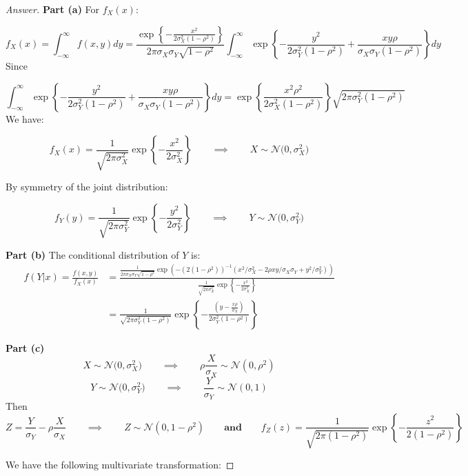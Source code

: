 \documentclass{article}
\theoremstyle{definition}
\newcommand{\qiq}{\qquad \implies \qquad}
\newcommand{\qaq}{\qquad \textbf{and} \qquad}
\begin{document}
\begin{proof}[Answer]
\textbf{Part (a)}
For $f_X(x)$:

$$f_{X}(x)=\int_{-\infty}^{\infty} f(x, y) d y=\frac{\exp \left\{-\frac{x^{2}}{2 \sigma_{X}^{2}\left(1-\rho^{2}\right)}\right\}}{2 \pi \sigma_{X} \sigma_{Y} \sqrt{1-\rho^{2}}} \int_{-\infty}^{\infty} \exp \left\{-\frac{y^{2}}{2 \sigma_{Y}^{2}\left(1-\rho^{2}\right)}+\frac{x y \rho}{\sigma_{X} \sigma_{Y}\left(1-\rho^{2}\right)}\right\} d y$$
Since

$$\int_{-\infty}^{\infty} \exp \left\{-\frac{y^{2}}{2 \sigma_{Y}^{2}\left(1-\rho^{2}\right)}+\frac{x y \rho}{\sigma_{X} \sigma_{Y}\left(1-\rho^{2}\right)}\right\} d y=\exp \left\{\frac{x^{2} \rho^{2}}{2 \sigma_{X}^{2}\left(1-\rho^{2}\right)}\right\} \sqrt{2 \pi \sigma_{Y}^{2}\left(1-\rho^{2}\right)}$$
We have:

$$f_X(x) = \frac{1}{\sqrt{2 \pi \sigma_{X}^{2}}} \exp \left\{-\frac{x^{2}}{2 \sigma_{X}^{2}}\right\} \qiq X\sim\mathcal{N}\big(0, \sigma_X^2\big)$$

By symmetry of the joint distribution:

$$f_Y(y) = \frac{1}{\sqrt{2 \pi \sigma_{Y}^{2}}} \exp \left\{-\frac{y^{2}}{2 \sigma_{Y}^{2}}\right\} \qiq Y\sim\mathcal{N}\big(0, \sigma_Y^2\big)$$

\textbf{Part (b)}
The conditional distribution of $Y$ is:
\begin{align*}
f(Y|x) = \frac{f(x,y)}{f_X(x)} &= \frac{\frac{1}{2 \pi \sigma_{X} \sigma_{Y} \sqrt{1-\rho^{2}}} \exp \left(-\left(2\left(1-\rho^{2}\right)\right)^{-1}\left(x^{2} / \sigma_{X}^{2}-2 \rho x y / \sigma_{X} \sigma_{Y}+y^{2} / \sigma_{Y}^{2}\right)\right)}{\frac{1}{\sqrt{2 \pi \sigma_{X}^{2}}} \exp \left\{-\frac{x^{2}}{2 \sigma_{X}^{2}}\right\} } \\ &= \frac{1}{\sqrt{2 \pi \sigma_{Y}^{2}\left(1-\rho^{2}\right)}} \exp \left\{-\frac{\left(y-\frac{x \rho}{\sigma_{X}}\right)}{2 \sigma_{Y}^{2}\left(1-\rho^{2}\right)}\right\}
\end{align*}

\textbf{Part (c)}
$$X\sim\mathcal{N}\big(0, \sigma_X^2\big) \qiq \rho\frac{X}{\sigma_X} \sim \mathcal{N}(0,\rho^2)$$
$$Y\sim\mathcal{N}\big(0, \sigma_Y^2\big) \qiq \frac{Y}{\sigma_Y} \sim \mathcal{N}(0,1)$$
Then
$$Z = \frac{Y}{\sigma_Y} - \rho\frac{X}{\sigma_X} \qiq Z \sim \mathcal{N}(0,1-\rho^2) \qaq f_Z(z) = \frac{1}{\sqrt{2 \pi\left(1-\rho^{2}\right)}} \exp \left\{-\frac{z^{2}}{2\left(1-\rho^{2}\right)}\right\}$$


We have the following multivariate transformation:


\end{proof}
\end{document}
